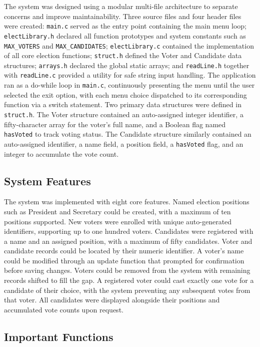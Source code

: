 \documentclass[12pt,a4paper]{article}
\begin{document}
The system was designed using a modular multi-file architecture to separate concerns
and improve maintainability. Three source files and four header files were created: \texttt{main.c} served as the
entry point containing the main menu loop; \texttt{electLibrary.h} declared all function
prototypes and system constants such as \texttt{MAX\_VOTERS} and \texttt{MAX\_CANDIDATES};
\texttt{electLibrary.c} contained the implementation of all core election functions;
\texttt{struct.h} defined the Voter and Candidate data structures; \texttt{arrays.h} declared
the global static arrays; and \texttt{readLine.h} together with \texttt{readLine.c} provided a
utility for safe string input handling. The application ran as a do-while loop in
\texttt{main.c}, continuously presenting the menu until the user selected the exit option,
with each menu choice dispatched to its corresponding function via a switch statement.
Two primary data structures were defined in \texttt{struct.h}. The Voter structure contained
an auto-assigned integer identifier, a fifty-character array for the voter's full name,
and a Boolean flag named \texttt{hasVoted} to track voting status. The Candidate structure
similarly contained an auto-assigned identifier, a name field, a position field, a
\texttt{hasVoted} flag, and an integer to accumulate the vote count.

\subsection{System Features}

The system was implemented with eight core features. Named election positions such as
President and Secretary could be created, with a maximum of ten positions supported.
New voters were enrolled with unique auto-generated identifiers, supporting up to one
hundred voters. Candidates were registered with a name and an assigned position, with
a maximum of fifty candidates. Voter and candidate records could be located by their
numeric identifier. A voter's name could be modified through an update function that
prompted for confirmation before saving changes. Voters could be removed from the
system with remaining records shifted to fill the gap. A registered voter could cast
exactly one vote for a candidate of their choice, with the system preventing any
subsequent votes from that voter. All candidates were displayed alongside their
positions and accumulated vote counts upon request.

\subsection{Important Functions}
\end{document}
